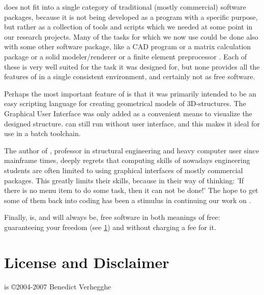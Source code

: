 \pyformex does not fit into a single category of traditional (mostly commercial) software packages, because it is not being developed as a program with a specific purpose, but rather as a collection of tools and scripts which we needed at some point in our research projects. Many of the tasks for which we now use \pyformex could be done also with some other software package, like a CAD program %
or a %
matrix calculation package or a solid modeler/renderer %
or a finite element preprocessor%
. Each of these is very well suited for the task it was designed for, but none provides all the features of \pyformex in a single consistent environment, and certainly not as free software. 

Perhaps the most important feature of \pyformex is that it was primarily intended to be an easy scripting language for creating geometrical models of 3D-structures. The Graphical User Interface was only added as a convenient means to visualize the designed structure. \pyformex can still run without user interface, and this makes it ideal for use in a batch toolchain.

The author of \pyformex, professor in structural engineering and heavy computer user since mainframe times, deeply regrets that computing skills of nowadays engineering students are often limited to using graphical interfaces of mostly commercial packages. This greatly limits their skills, because in their way of thinking: 'If there is no menu item to do some task, then it can not be done!'
The hope to get some of them back into coding has been a stimulus in continuing our work on \pyformex. 
 
Finally, \pyformex is, and will always be, free software in both meanings of free: guaranteeing your freedom (see \ref{sec:license}) and without charging a fee for it. 



\section{License and Disclaimer}
\label{sec:license}
\pyformex is \copyright 2004-2007 Benedict Verhegghe


